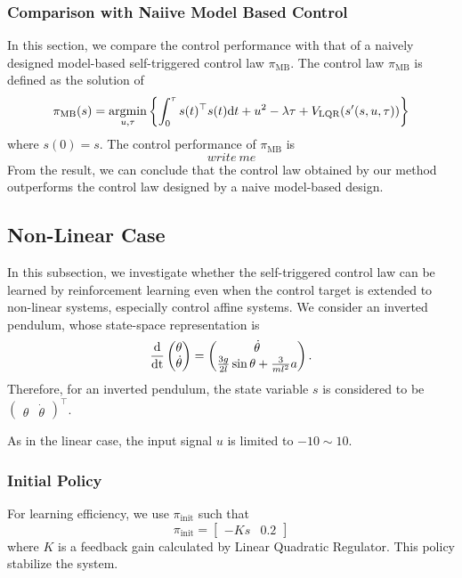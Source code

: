 \documentclass[english, dvipdfmx]{ampmt}             %
\newcommand{\argmin}{\mathop{\rm argmin}\limits}
\newcommand{\odif}[2]{\frac{\rm{d}#1}{\rm{d}#2}}
\begin{document}
\subsubsection{Comparison with Naiive Model Based Control}
In this section, we compare the control performance with that of a naively designed model-based self-triggered control law $\pi_{\textrm{MB}}$. The control law $\pi_{\textrm{MB}}$ is defined as the solution of 
\begin{equation}
	\pi_{\textrm{MB}}(s) = \argmin_{u,\tau} \left\{\int_{0}^{\tau} s(t)^{\top}s(t)\textrm{d}t + u^2 - \lambda\tau + V_{\textrm{LQR}}(s^{\prime}(s,u,\tau))\right\}
\end{equation}
where $s(0) = s$. The control performance of $\pi_{\textrm{MB}}$ is 
\begin{equation}
	write~me
\end{equation}
From the result, we can conclude that the control law obtained by our method outperforms the control law designed by a naive model-based design.


\subsection{Non-Linear Case}
In this subsection, we investigate whether the self-triggered control law can be learned by reinforcement learning even when the control target is extended to non-linear systems, especially control affine systems. We consider an inverted pendulum, whose state-space representation is
\begin{equation}
	\odif{}{t}\begin{pmatrix}\theta \\ \dot{\theta}\end{pmatrix} = 
		\begin{pmatrix}\dot{\theta} \\ \frac{3g}{2l}\sin{\theta} + \frac{3}{ml^2}a \end{pmatrix} \label{pendulum}.
\end{equation}
Therefore, for an inverted pendulum, the state variable $s$ is considered to be $\begin{pmatrix}\theta & \dot{\theta}\end{pmatrix}^{\top}$.
\par
As in the linear case, the input signal $u$ is limited to $-10 \sim 10$.

\subsubsection{Initial Policy}
For learning efficiency, we use $\pi_{\textrm{init}}$ such that
\begin{equation}
	\pi_{\textrm{init}} = \begin{bmatrix}-Ks&0.2\end{bmatrix}
\end{equation}
where $K$ is a feedback gain calculated by Linear Quadratic Regulator. This policy stabilize the system.
\end{document}
